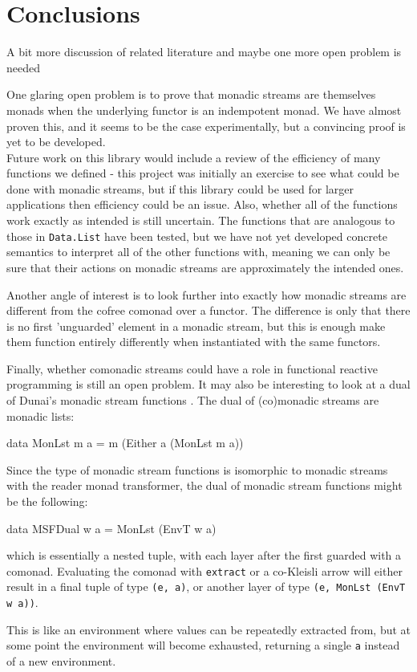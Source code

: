 \section{Conclusions}

\begin{ccomment} 
	A bit more discussion of related literature and maybe one more open problem is needed
\end{ccomment}

One glaring open problem is to prove that monadic streams are themselves monads when the underlying functor is an indempotent monad. We have almost proven this, and it seems to be the case experimentally, but a convincing proof is yet to be developed.\\

Future work on this library would include a review of the efficiency of many functions we defined - this project was initially an exercise to see what could be done with monadic streams, but if this library could be used for larger applications then efficiency could be an issue. Also, whether all of the functions work exactly as intended is still uncertain. The functions that are analogous to those in \verb+Data.List+ have been tested, but we have not yet developed concrete semantics to interpret all of the other functions with, meaning we can only be sure that their actions on monadic streams are approximately the intended ones.

Another angle of interest is to look further into exactly how monadic streams are different from the cofree comonad over a functor. The difference is only that there is no first 'unguarded' element in a monadic stream, but this is enough make them function entirely differently when instantiated with the same functors.

Finally, whether comonadic streams could have a role in functional reactive programming is still an open problem. It may also be interesting to look at a dual of Dunai's monadic stream functions \cite{dunai}. The dual of (co)monadic streams are monadic lists:
\begin{haskell}
data MonLst m a = m (Either a (MonLst m a)) 
\end{haskell}
Since the type of monadic stream functions is isomorphic to monadic streams with the reader monad transformer, the dual of monadic stream functions might be the following:
\begin{haskell}
data MSFDual w a = MonLst (EnvT w a)
\end{haskell}
which is essentially a nested tuple, with each layer after the first guarded with a comonad. Evaluating the comonad with \verb+extract+ or a co-Kleisli arrow will either result in a final tuple of type \verb+(e, a)+, or another layer of type \verb+(e, MonLst (EnvT w a))+. 

This is like an environment where values can be repeatedly extracted from, but at some point the environment will become exhausted, returning a single \verb+a+ instead of a new environment.
